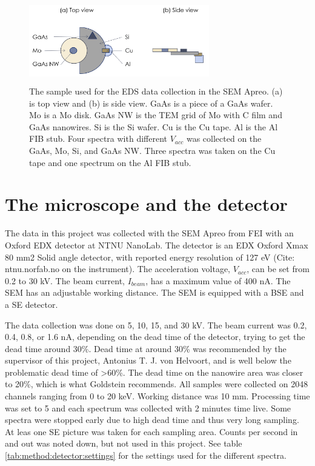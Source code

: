 \begin{figure}[ht]
    \centering
    \colorbox{white}{\includegraphics[width=0.7\textwidth]{figures/Materials-sample1.png}}
    \caption{
        The sample used for the EDS data collection in the SEM Apreo.
        (a) is top view and (b) is side view.
        GaAs is a piece of a GaAs wafer.
        Mo is a Mo disk.
        GaAs NW is the TEM grid of Mo with C film and GaAs nanowires.
        Si is the Si wafer.
        Cu is the Cu tape.
        Al is the Al FIB stub.
        Four spectra with different $V_{acc}$ was collected on the GaAs, Mo, Si, and GaAs NW.
        Three spectra was taken on the Cu tape and one spectrum on the Al FIB stub.
    }
    \label{fig:method:materials:sample1}
\end{figure}



%
%
\section{The microscope and the detector}
\label{sec:method:detector}
The data in this project was collected with the SEM Apreo from FEI with an Oxford EDX detector at NTNU NanoLab.
The detector is an EDX Oxford Xmax 80 mm2 Solid angle detector, with reported energy resolution of 127 eV (Cite: ntnu.norfab.no on the instrument).
The acceleration voltage, $V_{acc}$, can be set from 0.2 to 30 kV.
The beam current, $I_{beam}$, has a maximum value of 400 nA.
The SEM has an adjustable working distance.
The SEM is equipped with a BSE and a SE detector.

The data collection was done on 5, 10, 15, and 30 kV.
The beam current was 0.2, 0.4, 0.8, or 1.6 nA, depending on the dead time of the detector, trying to get the dead time around 30\%.
Dead time at around 30\% was recommended by the supervisor of this project, Antonius T. J. von Helvoort, and is well below the problematic dead time of >60\%.
The dead time on the nanowire area was closer to 20\%, which is what Goldstein \cite[page 223]{goldstein_scanning_2018} recommends.
All samples were collected on 2048 channels ranging from 0 to 20 keV.
Working distance was 10 mm.
Processing time was set to 5 and each spectrum was collected with 2 minutes time live.
Some spectra were stopped early due to high dead time and thus very long sampling.
At leas one SE picture was taken for each sampling area.
Counts per second in and out was noted down, but not used in this project.
See table \ref{tab:method:detector:settings} for the settings used for the different spectra.

